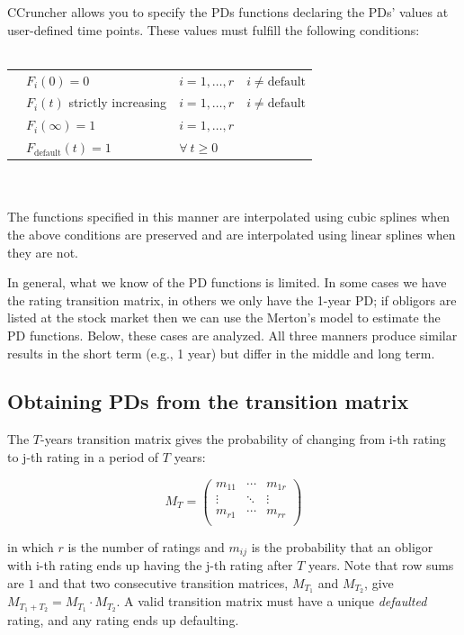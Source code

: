 \documentclass[11pt,fleqn]{book} %
\begin{document}
CCruncher allows you to specify the PDs functions declaring the PDs' values 
at user-defined time points. These values must fulfill the following conditions:
~\\
~\\
\begin{listliketab} 
	\begin{tabular}{Lll}
		\textbullet & $F_i(0) = 0$                 & $i=1,\dots,r \quad i \ne \text{default}$ \\
		\textbullet & $F_i(t)$ strictly increasing & $i=1,\dots,r \quad i \ne \text{default}$ \\
		\textbullet & $F_i(\infty) = 1$            & $i=1,\dots,r$ \\
		\textbullet & $F_{\text{default}}(t) = 1$  & $\forall\ t \ge 0$ \\
	\end{tabular} 
\end{listliketab}
~\\
~\\
The functions specified in this manner are interpolated using cubic splines
when the above conditions are preserved and are interpolated using linear 
splines when they are not.

In general, what we know of the PD functions is limited. In some cases we have 
the rating transition matrix, in others we only have the 1-year PD; if obligors 
are listed at the stock market then we can use the Merton's model to estimate the 
PD functions. Below, these cases are analyzed. All three manners produce 
similar results in the short term (e.g., 1 year) but differ in the middle and
long term.

\subsection{Obtaining PDs from the transition matrix}
\label{pdftm}

\begin{definition}
	\label{def:tm}
	The $T$-years transition matrix gives the probability of changing 
	from i-th rating to j-th rating in a period of $T$ years:
	{\small
	\begin{displaymath}
		M_T = \left(
		\begin{array}{ccc}
			m_{11} & \cdots & m_{1r} \\
			\vdots & \ddots & \vdots \\
			m_{r1} & \cdots & m_{rr} \\
		\end{array}
		\right)
	\end{displaymath}\par}
	in which $r$ is the number of ratings and $m_{ij}$ is the probability that 
	an obligor with i-th rating ends up having the j-th rating after $T$ years.
	Note that row sums are $1$ and that two consecutive transition matrices, 
	$M_{T_1}$ and $M_{T_2}$, give $M_{T_1+T_2} = M_{T_1} \cdot M_{T_2}$.
	A valid transition matrix must have a unique \emph{defaulted} rating, and 
	any rating ends up defaulting.
\end{definition}
\end{document}
